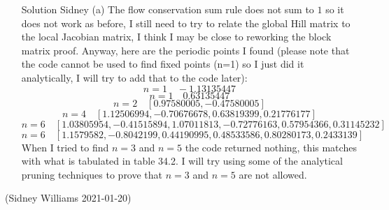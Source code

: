{\begin{itemize}
\item[Solution Sidney]
(a) The flow conservation sum rule does not sum to $1$ so it does not
work as before, I still need to try to relate the global Hill matrix to
the local Jacobian matrix, I think I may be close to reworking the block
matrix proof. Anyway, here are the periodic points I found (please note
that the code cannot be used to find fixed points (n=1) so I just did it
analytically, I will try to add that to the code later):
$$n=1\quad -1.13135447$$
$$n=1\quad 0.63135447$$
$$n=2\quad [0.97580005, -0.47580005]$$
$$n=4\quad [1.12506994,-0.70676678,0.63819399,0.21776177]$$
$$n=6\quad [1.03805954, -0.41515894, 1.07011813, -0.72776163, 0.57954366, 0.31145232]$$
$$n=6\quad [1.1579582, -0.8042199, 0.44190995, 0.48533586, 0.80280173, 0.2433139]$$
When I tried to find $n=3$ and $n=5$ the code returned nothing, this
matches with what is tabulated in table 34.2. I will try using some of
the analytical pruning techniques to prove that $n=3$ and $n=5$ are not
allowed.

\end{itemize}
\hfill (Sidney Williams 2021-01-20)
    } %
